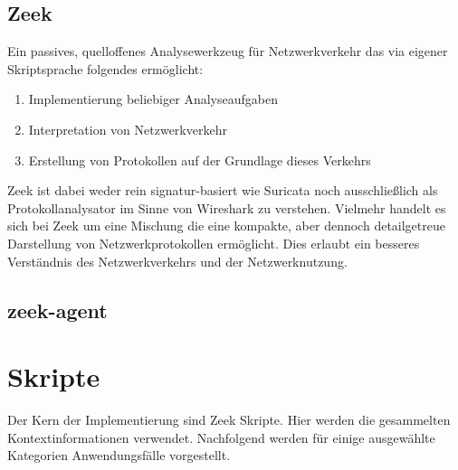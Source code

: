 \subsection{Zeek}
Ein passives, quelloffenes Analysewerkzeug für Netzwerkverkehr das via eigener  Skriptsprache folgendes ermöglicht:
\begin{enumerate}
\item{Implementierung beliebiger Analyseaufgaben}
\item{Interpretation von Netzwerkverkehr}
\item{Erstellung von Protokollen auf der Grundlage dieses Verkehrs}
\end{enumerate}
Zeek ist dabei weder rein signatur-basiert wie Suricata noch ausschließlich als Protokollanalysator im Sinne von Wireshark zu verstehen. Vielmehr handelt es sich bei Zeek um eine Mischung die eine kompakte, aber dennoch detailgetreue Darstellung von Netzwerkprotokollen ermöglicht. Dies erlaubt ein besseres Verständnis des Netzwerkverkehrs und der Netzwerknutzung.
\subsection{zeek-agent}
\newpage
\section{Skripte}
Der Kern der Implementierung sind Zeek Skripte. Hier werden die gesammelten Kontextinformationen verwendet. Nachfolgend werden für einige ausgewählte Kategorien Anwendungsfälle vorgestellt.
